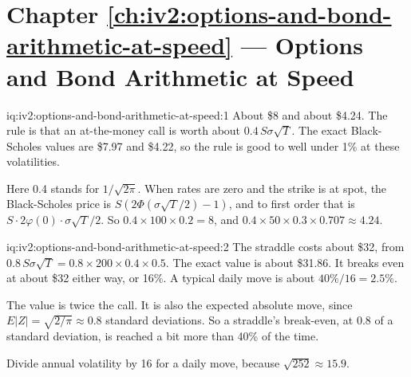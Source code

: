 \section*{Chapter \ref{ch:iv2:options-and-bond-arithmetic-at-speed} --- Options and Bond Arithmetic at Speed}

\begin{solution}{iq:iv2:options-and-bond-arithmetic-at-speed:1}
About \$8 and about \$4.24. The rule is that an at-the-money call is worth about $0.4\,S\sigma\sqrt{T}$. The exact Black-Scholes values are \$7.97 and \$4.22, so the rule is good to well under 1\% at these volatilities.

Here 0.4 stands for $1/\sqrt{2\pi}$. When rates are zero and the strike is at spot, the Black-Scholes price is $S(2\Phi(\sigma\sqrt T/2) - 1)$, and to first order that is $S \cdot 2\varphi(0) \cdot \sigma\sqrt T/2$. So $0.4 \times 100 \times 0.2 = 8$, and $0.4 \times 50 \times 0.3 \times 0.707 \approx 4.24$.

\end{solution}

\begin{solution}{iq:iv2:options-and-bond-arithmetic-at-speed:2}
The straddle costs about \$32, from $0.8\,S\sigma\sqrt T = 0.8 \times 200 \times 0.4 \times 0.5$. The exact value is about \$31.86. It breaks even at about \$32 either way, or 16\%. A typical daily move is about $40\%/16 = 2.5\%$.

The value is twice the call. It is also the expected absolute move, since $E|Z| = \sqrt{2/\pi} \approx 0.8$ standard deviations. So a straddle's break-even, at 0.8 of a standard deviation, is reached a bit more than 40\% of the time.

Divide annual volatility by 16 for a daily move, because $\sqrt{252} \approx 15.9$.

\end{solution}

